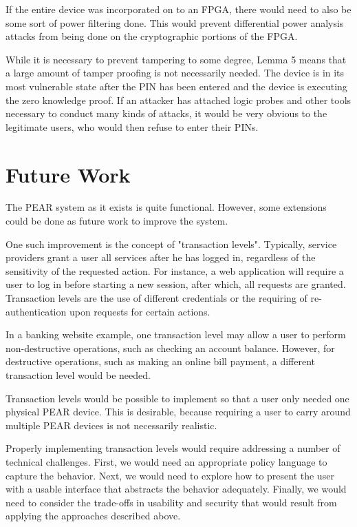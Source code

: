 If the entire device was incorporated on to an FPGA, there would need to also be some sort of power filtering done.
This would prevent differential power analysis attacks from being done on the cryptographic portions of the FPGA.

While it is necessary to prevent tampering to some degree, Lemma 5 means that a large amount of tamper proofing
is not necessarily needed. The device is in its most vulnerable state after the PIN has been entered and the device is
executing the zero knowledge proof. If an attacker has attached logic probes and other tools necessary to conduct
many kinds of attacks, it would be very obvious to the legitimate users, who would then refuse to enter their PINs.

\section{Future Work}
The PEAR system as it exists is quite functional. However, some extensions could be done as future work to improve
the system. 

One such improvement is the concept of "transaction levels". Typically, service providers grant a user all services after
he has logged in, regardless of the sensitivity of the requested action. For instance, a web application will require a
user to log in before starting a new session, after which, all requests are granted. Transaction levels are the use of
different credentials or the requiring of re-authentication upon requests for certain actions. 

In a banking website 
example, one transaction level may allow a user to perform non-destructive operations, such as checking an account
balance. However, for destructive operations, such as making an online bill payment, a different transaction level
would be needed.

Transaction levels would be possible to implement so that a user only needed one physical PEAR device. This is
desirable, because requiring a user to carry around multiple PEAR devices is not necessarily realistic.

Properly implementing transaction levels would require addressing a number of technical challenges. First, we would 
need an appropriate policy language to capture the behavior. Next, we would need to explore how to present the user 
with a usable interface that abstracts the behavior adequately. Finally, we would need to consider the trade-offs in 
usability and security that would result from applying the approaches described above.
